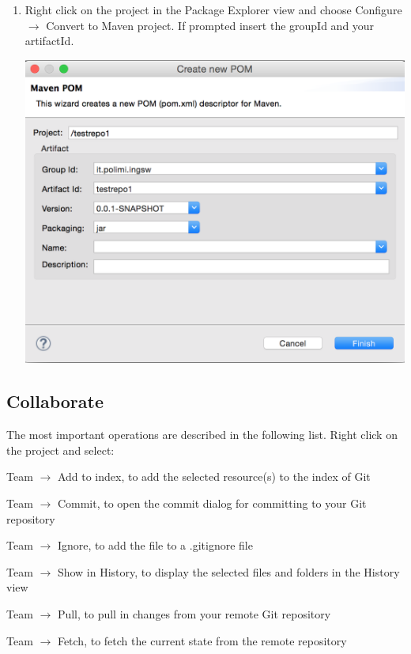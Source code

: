\documentclass{article}
\begin{document}
\begin{enumerate}
\item Right click on the project in the Package Explorer view  and choose Configure $\rightarrow$ Convert to Maven project. If prompted insert the groupId and your artifactId.

\begin{center}
\includegraphics[scale=0.35]{figures/s19.png}
\end{center}

\end{enumerate}

\subsection{Collaborate}

The most important operations are described in the following
list. Right click on the project and select:

Team $\rightarrow$ Add to index, to add the selected resource(s) to the index of Git

Team $\rightarrow$ Commit, to open the commit dialog for committing to your Git repository

Team $\rightarrow$ Ignore, to add the file to a .gitignore file

Team $\rightarrow$ Show in History, to display the selected files and folders in the History view

Team $\rightarrow$ Pull, to pull in changes from your remote Git repository

Team $\rightarrow$ Fetch, to fetch the current state from the remote repository
\end{document}
